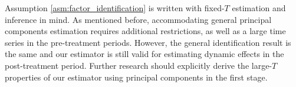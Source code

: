 \documentclass[12pt]{article}
\begin{document}
Assumption \ref{asm:factor_identification} is written with fixed-$T$ estimation and inference in mind. As mentioned before, accommodating general principal components estimation requires additional restrictions, as well as a large time series in the pre-treatment periods. However, the general identification result is the same and our estimator is still valid for estimating dynamic effects in the post-treatment period. Further research should explicitly derive the large-$T$ properties of our estimator using principal components in the first stage. 
\end{document}
